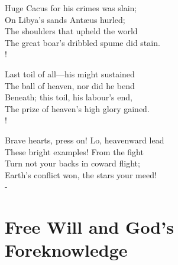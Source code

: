 \documentclass[12pt]{book}
\newenvironment{vpoem}[1]%
  {\def\poemvsindentlines{#1}\begin{poem}\small}%
  {\end{poem}\def\poemvsindentlines{\relax}}
\begin{document}
\begin{vpoem}{23}
    Huge Cacus for his crimes was slain; \\
      On Libya's sands Antæus hurled; \\
      The shoulders that upheld the world \\
    The great boar's dribbled spume did stain. \\!

    Last toil of all---his might sustained \\
      The ball of heaven, nor did he bend \\
      Beneath; this toil, his labour's end, \\
    The prize of heaven's high glory gained. \\!

    Brave hearts, press on! Lo, heavenward lead \\
      These bright examples! From the fight \\
      Turn not your backs in coward flight; \\
    Earth's conflict won, the stars your meed! \\-
\end{vpoem}




\chapter{Free Will and God's Foreknowledge}
\end{document}
